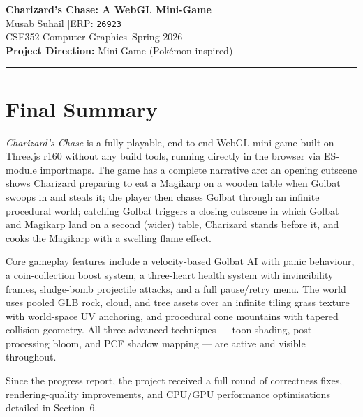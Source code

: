 \documentclass[11pt,a4paper]{article}
\begin{document}
\begin{center}
    {\LARGE\bfseries Charizard's Chase: A WebGL Mini-Game}\\[4pt]
    {\large Musab Suhail \quad|\quad ERP: \texttt{26923}}\\[2pt]
    {\normalsize CSE352 Computer Graphics\quad--\quad Spring 2026}\\[2pt]
    {\normalsize \textbf{Project Direction:} Mini Game (Pokémon-inspired)}
\end{center}

\vspace{-4pt}\noindent\rule{\linewidth}{0.6pt}\vspace{6pt}

\section{Final Summary}

\textit{Charizard's Chase} is a fully playable, end-to-end WebGL mini-game built
on Three.js r160 without any build tools, running directly in the browser via
ES-module importmaps. The game has a complete narrative arc: an opening cutscene
shows Charizard preparing to eat a Magikarp on a wooden table when Golbat swoops
in and steals it; the player then chases Golbat through an infinite procedural
world; catching Golbat triggers a closing cutscene in which Golbat and Magikarp
land on a second (wider) table, Charizard stands before it, and cooks the
Magikarp with a swelling flame effect.

Core gameplay features include a velocity-based Golbat AI with panic behaviour, a
coin-collection boost system, a three-heart health system with invincibility frames,
sludge-bomb projectile attacks, and a full pause/retry menu. The world uses pooled
GLB rock, cloud, and tree assets over an infinite tiling grass texture with
world-space UV anchoring, and procedural cone mountains with tapered collision
geometry. All three advanced techniques --- toon shading, post-processing bloom, and
PCF shadow mapping --- are active and visible throughout.

Since the progress report, the project received a full round of correctness fixes,
rendering-quality improvements, and CPU/GPU performance optimisations detailed in
Section~6.

\end{document}
